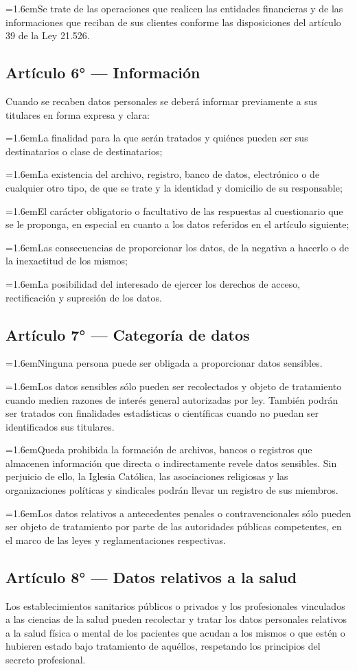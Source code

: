 \documentclass[10pt,a4paper]{article}
\newcommand{\articulo}[1]{\subsection{#1}}
\newcommand{\inciso}[2]{\par{\hangindent=1.6em\hangafter=1\makebox[1.6em][l]{#1}#2\par}}
\begin{document}
\inciso{e)}{Se trate de las operaciones que realicen las entidades financieras y de las informaciones que reciban de sus clientes conforme las disposiciones del artículo 39 de la Ley 21.526.}

\articulo{Artículo 6° --- Información}
Cuando se recaben datos personales se deberá informar previamente a sus titulares en forma expresa y clara:

\inciso{a)}{La finalidad para la que serán tratados y quiénes pueden ser sus destinatarios o clase de destinatarios;}

\inciso{b)}{La existencia del archivo, registro, banco de datos, electrónico o de cualquier otro tipo, de que se trate y la identidad y domicilio de su responsable;}

\inciso{c)}{El carácter obligatorio o facultativo de las respuestas al cuestionario que se le proponga, en especial en cuanto a los datos referidos en el artículo siguiente;}

\inciso{d)}{Las consecuencias de proporcionar los datos, de la negativa a hacerlo o de la inexactitud de los mismos;}

\inciso{e)}{La posibilidad del interesado de ejercer los derechos de acceso, rectificación y supresión de los datos.}

\articulo{Artículo 7° --- Categoría de datos}
\inciso{1.}{Ninguna persona puede ser obligada a proporcionar datos sensibles.}

\inciso{2.}{Los datos sensibles sólo pueden ser recolectados y objeto de tratamiento cuando medien razones de interés general autorizadas por ley. También podrán ser tratados con finalidades estadísticas o científicas cuando no puedan ser identificados sus titulares.}

\inciso{3.}{Queda prohibida la formación de archivos, bancos o registros que almacenen información que directa o indirectamente revele datos sensibles. Sin perjuicio de ello, la Iglesia Católica, las asociaciones religiosas y las organizaciones políticas y sindicales podrán llevar un registro de sus miembros.}

\inciso{4.}{Los datos relativos a antecedentes penales o contravencionales sólo pueden ser objeto de tratamiento por parte de las autoridades públicas competentes, en el marco de las leyes y reglamentaciones respectivas.}

\articulo{Artículo 8° --- Datos relativos a la salud}
Los establecimientos sanitarios públicos o privados y los profesionales vinculados a las ciencias de la salud pueden recolectar y tratar los datos personales relativos a la salud física o mental de los pacientes que acudan a los mismos o que estén o hubieren estado bajo tratamiento de aquéllos, respetando los principios del secreto profesional.
\end{document}

